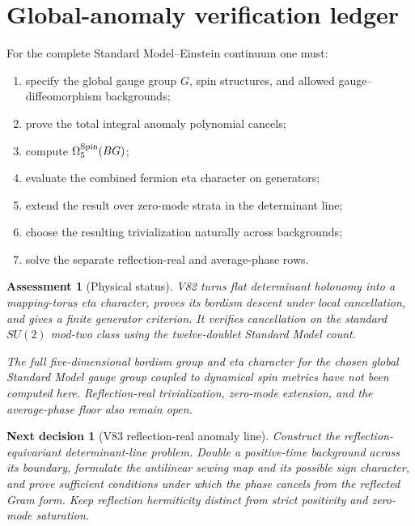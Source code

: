 \documentclass[11pt]{article}
\newtheorem{decision}[theorem]{Next decision}
\newtheorem{assessment}[theorem]{Assessment}
\theoremstyle{remark}
\begin{document}
\section{Global-anomaly verification ledger}

For the complete Standard Model--Einstein continuum one must:
\begin{enumerate}
\item specify the global gauge group \(G\), spin structures, and
      allowed gauge--diffeomorphism backgrounds;
\item prove the total integral anomaly polynomial cancels;
\item compute \(\Omega^{\rm Spin}_5(BG)\);
\item evaluate the combined fermion eta character on generators;
\item extend the result over zero-mode strata in the determinant
      line;
\item choose the resulting trivialization naturally across
      backgrounds;
\item solve the separate reflection-real and average-phase rows.
\end{enumerate}

\begin{assessment}[Physical status]
\label{ass:v15v82-status}
V82 turns flat determinant holonomy into a mapping-torus eta
character, proves its bordism descent under local cancellation, and
gives a finite generator criterion.  It verifies cancellation on
the standard \(SU(2)\) mod-two class using the twelve-doublet
Standard Model count.

The full five-dimensional bordism group and eta character for the
chosen global Standard Model gauge group coupled to dynamical
spin metrics have not been computed here.  Reflection-real
trivialization, zero-mode extension, and the average-phase floor
also remain open.
\end{assessment}

\begin{decision}[V83 reflection-real anomaly line]
\label{dec:v15v82-next}
Construct the reflection-equivariant determinant-line problem.
Double a positive-time background across its boundary, formulate
the antilinear sewing map and its possible sign character, and
prove sufficient conditions under which the phase cancels from the
reflected Gram form.  Keep reflection hermiticity distinct from
strict positivity and zero-mode saturation.
\end{decision}
\end{document}
